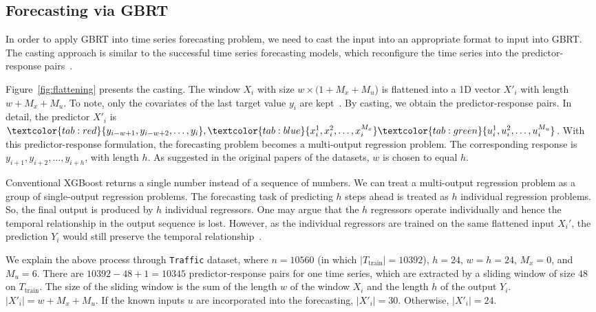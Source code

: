 \subsection{Forecasting via GBRT} %

In order to apply GBRT into time series forecasting problem,
we need to cast the input into an appropriate format to input into GBRT.
The casting approach is similar to the successful time series forecasting models, which reconfigure the time series into the predictor-response pairs~\cite{elsayed2021we}.

Figure~\ref{fig:flattening} presents the casting.
The window $X_i$ with size $w \times (1+ M_x + M_u$) is flattened into a 1D vector $X'_i$ with length $w + M_x + M_u$.
To note, only the covariates of the last target value $y_i$ are kept~\cite{elsayed2021we}.
%
By casting, we obtain the predictor-response pairs.
In detail, the predictor $X'_i$ is $\textcolor{tab:red}{y_{i-w+1}, y_{i-w+2}, \dots, y_i}, \textcolor{tab:blue}{x_i^1, x_i^2, \dots, x_i^{M_x}} \textcolor{tab:green}{u_i^1, u_i^2, \dots, u_i^{M_u}}$.
%
With this predictor-response formulation, the forecasting problem becomes a multi-output regression problem.
The corresponding response is $y_{i+1}, y_{i+2}, \dots, y_{i+h}$, with length $h$.
As suggested in the original papers of the datasets, $w$ is chosen to equal $h$.

Conventional XGBoost returns a single number instead of a sequence of numbers.
We can treat a multi-output regression problem as a group of single-output regression problems.
The forecasting task of predicting $h$ steps ahead is treated as $h$ individual regression problems.
So, the final output is produced by $h$ individual regressors.
One may argue that the $h$ regressors operate individually and hence the temporal relationship in the output sequence is lost.
However, as the individual regressors are trained on the same flattened input $X_i'$, the prediction $Y_i$ would still preserve the temporal relationship~\cite{elsayed2021we}.

We explain the above process through \texttt{Traffic} dataset, where $n = 10560$ (in which $|T_{\mathrm{train}}| = 10392$), $h = 24$, $w = h = 24$, $M_x = 0$, and $M_u = 6$.
There are $10392-48+1 = 10345$ predictor-response pairs for one time series, which are extracted by a sliding window of size $48$ on $T_{\mathrm{train}}$.
The size of the sliding window is the sum of the length $w$ of the window $X_i$ and the length $h$ of the output $Y_i$.
$|X'_i| = w + M_x + M_u$.
If the known inputs $u$ are incorporated into the forecasting, $|X'_i| = 30$.
Otherwise, $|X'_i| = 24$.


